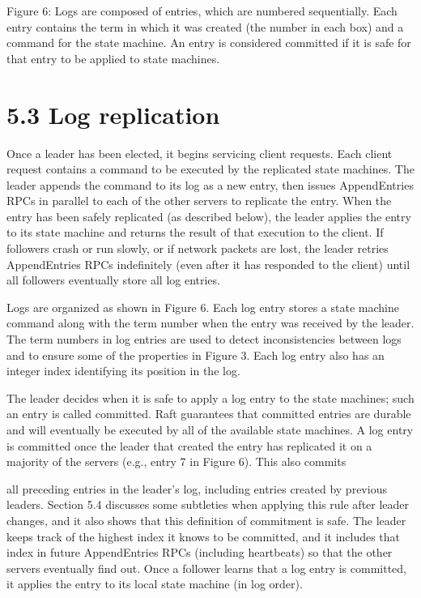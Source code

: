\documentclass[
]{article}
\begin{document}
Figure 6: Logs are composed of entries, which are numbered sequentially.
Each entry contains the term in which it was created (the number in each
box) and a command for the state machine. An entry is considered
committed if it is safe for that entry to be applied to state machines.

\section{5.3 Log replication}\label{log-replication}

Once a leader has been elected, it begins servicing client requests.
Each client request contains a command to be executed by the replicated
state machines. The leader appends the command to its log as a new
entry, then issues AppendEntries RPCs in parallel to each of the other
servers to replicate the entry. When the entry has been safely
replicated (as described below), the leader applies the entry to its
state machine and returns the result of that execution to the client. If
followers crash or run slowly, or if network packets are lost, the
leader retries AppendEntries RPCs indefinitely (even after it has
responded to the client) until all followers eventually store all log
entries.

Logs are organized as shown in Figure 6. Each log entry stores a state
machine command along with the term number when the entry was received
by the leader. The term numbers in log entries are used to detect
inconsistencies between logs and to ensure some of the properties in
Figure 3. Each log entry also has an integer index identifying its
position in the log.

The leader decides when it is safe to apply a log entry to the state
machines; such an entry is called committed. Raft guarantees that
committed entries are durable and will eventually be executed by all of
the available state machines. A log entry is committed once the leader
that created the entry has replicated it on a majority of the servers
(e.g., entry 7 in Figure 6). This also commits

all preceding entries in the leader's log, including entries created by
previous leaders. Section 5.4 discusses some subtleties when applying
this rule after leader changes, and it also shows that this definition
of commitment is safe. The leader keeps track of the highest index it
knows to be committed, and it includes that index in future
AppendEntries RPCs (including heartbeats) so that the other servers
eventually find out. Once a follower learns that a log entry is
committed, it applies the entry to its local state machine (in log
order).
\end{document}
